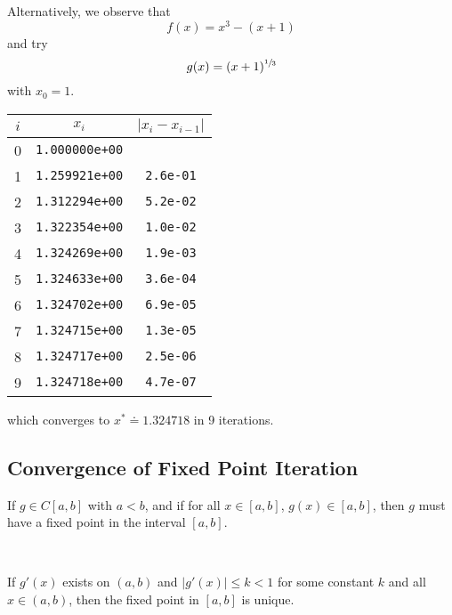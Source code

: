 \begin{example}
    Alternatively, we observe that \[
        f(x) = x^3 - (x + 1)
    \] and try \[
        g(x) = (x + 1)^{\sfrac{1}{3}}
    \] with \( x_0 = 1 \).

    \begin{table}[H]
        \centering
        \begin{tabular}{c|c|c}
            \( i \) & \( x_i \)             & \( | x_i - x_{i-1} | \)
            \\ \hline \hline
            0       & \texttt{1.000000e+00} &
            \\
            1       & \texttt{1.259921e+00} & \texttt{2.6e-01}
            \\
            2       & \texttt{1.312294e+00} & \texttt{5.2e-02}
            \\
            3       & \texttt{1.322354e+00} & \texttt{1.0e-02}
            \\
            4       & \texttt{1.324269e+00} & \texttt{1.9e-03}
            \\
            5       & \texttt{1.324633e+00} & \texttt{3.6e-04}
            \\
            6       & \texttt{1.324702e+00} & \texttt{6.9e-05}
            \\
            7       & \texttt{1.324715e+00} & \texttt{1.3e-05}
            \\
            8       & \texttt{1.324717e+00} & \texttt{2.5e-06}
            \\
            9       & \texttt{1.324718e+00} & \texttt{4.7e-07}
        \end{tabular}
    \end{table}
    which converges to \( x^\ast \doteq 1.324718 \) in 9 iterations.
\end{example}

\subsection{Convergence of Fixed Point Iteration}

\begin{theorem}
     If \( g \in C[a, b] \) with \( a < b \), and if for all \( x \in [a, b] \), \( g(x) \in [a, b] \), then \( g \) must have a fixed point in the interval \( [a, b] \).

        {~~~}

     If \( g'(x) \) exists on \( (a, b) \) and \( | g'(x) | \leq k < 1 \) for some constant \( k \) and all \( x \in (a, b) \), then the fixed point in \( [a, b] \) is unique.
\end{theorem}

